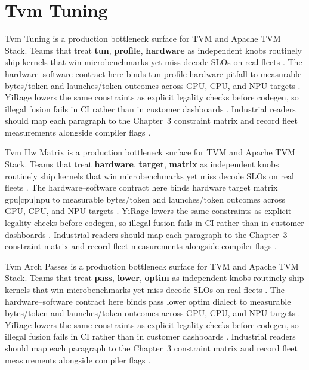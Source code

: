 \section{Tvm Tuning}
\label{sec:tvm_tuning}

Tvm Tuning is a production bottleneck surface for TVM and Apache TVM Stack. Teams that treat \textbf{tun}, \textbf{profile}, \textbf{hardware} as independent knobs routinely ship kernels that win microbenchmarks yet miss decode SLOs on real fleets \citep{nvidia2022hopper,amd2024aie}. The hardware--software contract here binds tun profile hardware pitfall to measurable bytes/token and launches/token outcomes across GPU, CPU, and NPU targets \citep{semianalysis2024tma,dlbook}. YiRage lowers the same constraints as explicit legality checks before codegen, so illegal fusion fails in CI rather than in customer dashboards \citep{amd2024xdna,dao2022flashattention}. Industrial readers should map each paragraph to the Chapter~3 constraint matrix and record fleet measurements alongside compiler flags \citep{amd2024aie,kwon2023vllm}.

Tvm Hw Matrix is a production bottleneck surface for TVM and Apache TVM Stack. Teams that treat \textbf{hardware}, \textbf{target}, \textbf{matrix} as independent knobs routinely ship kernels that win microbenchmarks yet miss decode SLOs on real fleets \citep{taxbreak2026,semianalysis2024tma}. The hardware--software contract here binds hardware target matrix gpu|cpu|npu to measurable bytes/token and launches/token outcomes across GPU, CPU, and NPU targets \citep{memoryfloor2026,amd2024xdna}. YiRage lowers the same constraints as explicit legality checks before codegen, so illegal fusion fails in CI rather than in customer dashboards \citep{nvidia2022hopper,amd2024aie}. Industrial readers should map each paragraph to the Chapter~3 constraint matrix and record fleet measurements alongside compiler flags \citep{semianalysis2024tma,dlbook}.

Tvm Arch Passes is a production bottleneck surface for TVM and Apache TVM Stack. Teams that treat \textbf{pass}, \textbf{lower}, \textbf{optim} as independent knobs routinely ship kernels that win microbenchmarks yet miss decode SLOs on real fleets \citep{memoryfloor2026,amd2024xdna}. The hardware--software contract here binds pass lower optim dialect to measurable bytes/token and launches/token outcomes across GPU, CPU, and NPU targets \citep{nvidia2022hopper,amd2024aie}. YiRage lowers the same constraints as explicit legality checks before codegen, so illegal fusion fails in CI rather than in customer dashboards \citep{semianalysis2024tma,dlbook}. Industrial readers should map each paragraph to the Chapter~3 constraint matrix and record fleet measurements alongside compiler flags \citep{amd2024xdna,dao2022flashattention}.

